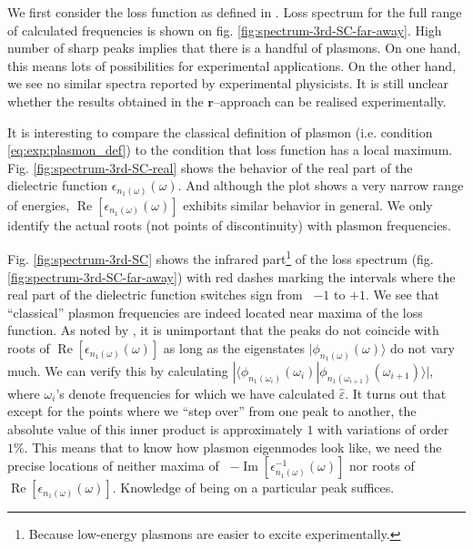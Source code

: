 \documentclass[a4paper,12pt]{article}
\begin{document}
    We first consider the loss function as defined in \cite{plasmonic2015}. Loss spectrum for the full range of calculated frequencies is shown on fig. \ref{fig:spectrum-3rd-SC-far-away}. High number of sharp peaks implies that there is a handful of plasmons. On one hand, this means lots of possibilities for experimental applications. On the other hand, we see no similar spectra reported by experimental physicists. It is still unclear whether the results obtained in the $\mathbf{r}$--approach can be realised experimentally.
    
    It is interesting to compare the classical definition of plasmon (i.e. condition \eqref{eq:exp:plasmon_def}) to the condition that loss function has a local maximum. Fig. \ref{fig:spectrum-3rd-SC-real} shows the behavior of the real part of the dielectric function $\epsilon_{n_1(\omega)}(\omega)$. And although the plot shows a very narrow range of energies, $\operatorname{Re} [\epsilon_{n_1(\omega)}(\omega)]$ exhibits similar behavior in general. We only identify the actual roots (not points of discontinuity) with plasmon frequencies.
    
    Fig. \ref{fig:spectrum-3rd-SC} shows the infrared part\footnote{%
        Because low-energy plasmons are easier to excite experimentally. 
    } of the loss spectrum (fig. \ref{fig:spectrum-3rd-SC-far-away}) with red dashes marking the intervals where the real part of the dielectric function switches sign from \ $-1$ to $+1$. We see that ``classical'' plasmon frequencies are indeed located near maxima of the loss function. As noted by \cite{andersen2012spatially}, it is unimportant that the peaks do not coincide with roots of $\operatorname{Re} [\epsilon_{n_1(\omega)}(\omega)]$ as long as the eigenstates $|\phi_{n_1(\omega)}(\omega)\rangle$ do not vary much. We can verify this by calculating $|\langle \phi_{n_1(\omega_i)}(\omega_i) | \phi_{n_1(\omega_{i+1})}(\omega_{i+1}) \rangle|$, where $\omega_i$'s denote frequencies for which we have calculated $\hat\varepsilon$. It turns out that except for the points where we ``step over'' from one peak to another, the absolute value of this inner product is approximately $1$ with variations of order $1\%$. This means that to know how plasmon eigenmodes look like, we need the precise locations of neither maxima of \ $-\operatorname{Im}[\epsilon_{n_1(\omega)}^{-1}(\omega)]$ nor roots of $\operatorname{Re} [\epsilon_{n_1(\omega)}(\omega)]$. Knowledge of being on a particular peak suffices. 
\end{document}
